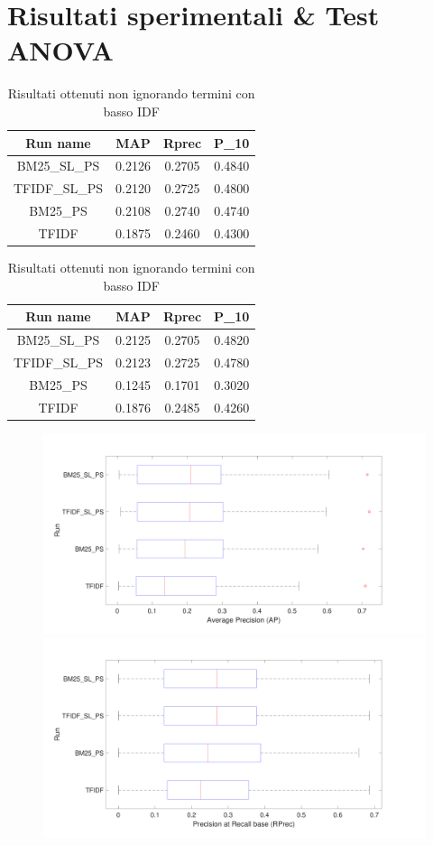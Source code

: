 \documentclass[a4paper, 9pt]{article}
\begin{document}
\section*{Risultati sperimentali \& Test ANOVA}

\begin{table}[h!]
\parbox{.45\linewidth}{
\begin{tabular}{ |c|c|c|c| }
\hline
Run name& MAP & Rprec & P\_10 \\
\hline
BM25\_SL\_PS & 0.2126 & 0.2705 & 0.4840 \\
TFIDF\_SL\_PS & 0.2120 & 0.2725 & 0.4800 \\
BM25\_PS & 0.2108 & 0.2740 & 0.4740 \\
TFIDF  & 0.1875 & 0.2460 & 0.4300 \\
\hline
\end{tabular}
\caption{Risultati ottenuti ignorando termini con basso IDF}
\label{table:1}
}
\hfill
\parbox{.45\linewidth}{
\begin{tabular}{ |c|c|c|c| }
\hline
Run name & MAP & Rprec & P\_10 \\
\hline
BM25\_SL\_PS & 0.2125 & 0.2705 & 0.4820 \\
TFIDF\_SL\_PS & 0.2123 & 0.2725 & 0.4780 \\
BM25\_PS & 0.1245 & 0.1701 & 0.3020 \\
TFIDF  & 0.1876 & 0.2485 & 0.4260 \\
\hline
\end{tabular}
\caption{Risultati ottenuti non ignorando termini con basso IDF}
\label{table:1}
}
\end{table}

\begin{figure}[htp]
\centering
\includegraphics[width=.5\linewidth]{ap-boxplot.pdf}\hfill
\includegraphics[width=.5\linewidth]{rprec-boxplot.pdf}
\end{figure}
\end{document}

